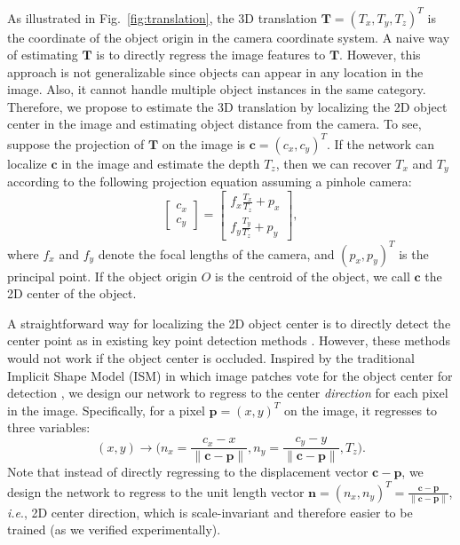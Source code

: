 \documentclass[conference]{IEEEtran}
\begin{document}
As illustrated in Fig.~\ref{fig:translation}, the 3D translation $\mathbf{T} = (T_x, T_y, T_z)^T$ is the coordinate of the object origin in the camera coordinate system. A naive way of estimating $\mathbf{T}$ is to directly regress the image features to $\mathbf{T}$. However, this approach is not generalizable since objects can appear in any location in the image. Also, it cannot handle multiple object instances in the same category. Therefore, we propose to estimate the 3D translation by localizing the 2D object center in the image and estimating object distance from the camera. To see, suppose the projection of $\mathbf{T}$ on the image is $\mathbf{c} = (c_x, c_y)^T$. If the network can localize $\mathbf{c}$ in the image and estimate the depth $T_z$, then we can recover $T_x$ and $T_y$ according to the following projection equation assuming a pinhole camera:
\begin{equation} \label{eq:projection}
\begin{bmatrix}
c_x \\[0.5em] c_y
\end{bmatrix} = \begin{bmatrix}
f_x \frac{T_x}{T_z} + p_x \\[0.5em]
f_y \frac{T_y}{T_z} + p_y
\end{bmatrix},
\end{equation}
where $f_x$ and $f_y$ denote the focal lengths of the camera, and $(p_x, p_y)^T$ is the principal point. If the object origin $O$ is the centroid of the object, we call $\mathbf{c}$ the 2D center of the object.

A straightforward way for localizing the 2D object center is to directly detect the center point as in existing key point detection methods \cite{pavlakos2017,cao2017realtime}. However, these methods would not work if the object center is occluded.  Inspired by the traditional Implicit Shape Model (ISM) in which image patches vote for the object center for detection \cite{leibe2004combined}, we design our network to regress to the center \emph{direction} for each pixel in the image. Specifically, for a pixel $\mathbf{p} = (x, y)^T$ on the image, it regresses to three variables:
\begin{equation} \label{eq::center}
(x, y) \rightarrow \Big(n_x = \frac{c_x - x}{\| \mathbf{c} - \mathbf{p} \|}, n_y = \frac{c_y - y}{\| \mathbf{c} - \mathbf{p} \|}, T_z\Big).
\end{equation}
Note that instead of directly regressing to the displacement vector $\mathbf{c} - \mathbf{p}$, we design the network to regress to the unit length vector $\mathbf{n} = (n_x, n_y)^T = \frac{\mathbf{c} - \mathbf{p}}{\| \mathbf{c} - \mathbf{p} \|}$, \emph{i.e}., 2D center direction, which is scale-invariant and therefore easier to be trained (as we verified experimentally).
\end{document}
